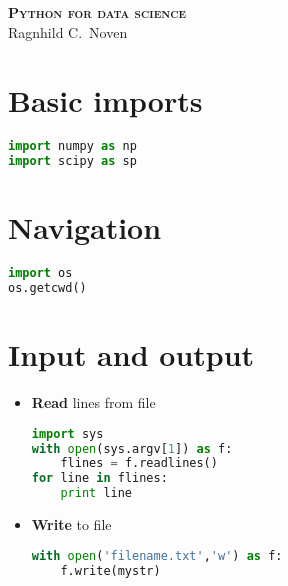 \documentclass[11pt]{article}
\begin{document}
\centering

{\scshape\huge \bfseries Python for data science} \\[4pt]
{\large Ragnhild C.~Noven}

\vspace{6pt}

\raggedright
\footnotesize
\begin{multicols*}{3}


\setlength{\premulticols}{1pt}
\setlength{\postmulticols}{1pt}
\setlength{\multicolsep}{30pt}
\setlength{\columnsep}{2pt}

\section{Basic imports}
\vspace{2pt}
\begin{lstlisting}[language=Python,linewidth=0.95\linewidth]
import numpy as np 
import scipy as sp 
\end{lstlisting}

\section{Navigation}
\vspace{2pt}
\begin{minipage}{0.95\linewidth}
  \centering
\begin{lstlisting}[language=Python]
import os     
os.getcwd()
\end{lstlisting}
\end{minipage}


\section{Input and output}

\begin{itemize}[wide = 4pt, labelindent=\parindent]
  
\item \textbf{Read} lines from file
\vspace{2pt}
\begin{lstlisting}[language=Python,linewidth=0.95\linewidth]
import sys
with open(sys.argv[1]) as f:
    flines = f.readlines() 
for line in flines: 
    print line 
\end{lstlisting}

\item \textbf{Write} to file
\vspace{2pt}
\begin{lstlisting}[language=Python,linewidth=0.95\linewidth]
with open('filename.txt','w') as f:
    f.write(mystr)
\end{lstlisting}
\end{itemize}




\end{multicols*}
\end{document}
